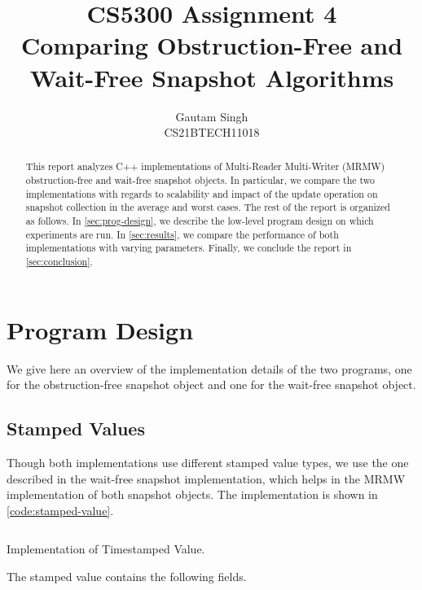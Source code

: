 \documentclass[conference,compsoc]{IEEEtran}
\begin{document}
\title{CS5300 Assignment 4\\Comparing Obstruction-Free and Wait-Free Snapshot Algorithms}
\author{Gautam Singh\\CS21BTECH11018}
\maketitle
\tableofcontents

\bigskip

\begin{abstract}
    This report analyzes C++ implementations of Multi-Reader Multi-Writer (MRMW)
    obstruction-free and wait-free snapshot objects. In particular, we compare
    the two implementations with regards to scalability and impact of the update
    operation on snapshot collection in the average and worst cases. The rest of
    the report is organized as follows. In \autoref{sec:prog-design}, we
    describe the low-level program design on which experiments are run. In
    \autoref{sec:results}, we compare the performance of both implementations
    with varying parameters. Finally, we conclude the report in
    \autoref{sec:conclusion}.
\end{abstract}

\section{Program Design}
\label{sec:prog-design}

We give here an overview of the implementation details of the two programs, one
for the obstruction-free snapshot object and one for the wait-free snapshot
object.

\subsection{Stamped Values}
Though both implementations use different stamped value types, we use the one
described in the wait-free snapshot implementation, which helps in the MRMW
implementation of both snapshot objects. The implementation is shown in
\autoref{code:stamped-value}.

\begin{listing}[!ht]
    \inputminted{cpp}{codes/StampedValue.cpp}
    \caption{Implementation of Timestamped Value.}
    \label{code:stamped-value}
\end{listing}

The stamped value contains the following fields.
\end{document}
